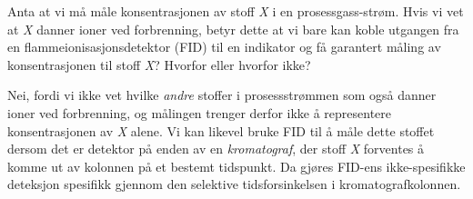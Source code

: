 

Anta at vi må måle konsentrasjonen av stoff {\it X} i en prosessgass-strøm. Hvis vi vet at {\it X} danner ioner ved forbrenning, betyr dette at vi bare kan koble utgangen fra en flammeionisasjonsdetektor (FID) til en indikator og få garantert måling av konsentrasjonen til stoff {\it X}? Hvorfor eller hvorfor ikke?







Nei, fordi vi ikke vet hvilke {\it andre} stoffer i prosessstrømmen som også danner ioner ved forbrenning, og målingen trenger derfor ikke å representere konsentrasjonen av {\it X} alene. Vi kan likevel bruke FID til å måle dette stoffet dersom det er detektor på enden av en {\it kromatograf}, der stoff {\it X} forventes å komme ut av kolonnen på et bestemt tidspunkt. Da gjøres FID-ens ikke-spesifikke deteksjon spesifikk gjennom den selektive tidsforsinkelsen i kromatografkolonnen.










